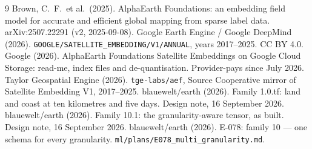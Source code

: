 \documentclass[10pt]{article}
\newcommand{\code}[1]{\texttt{#1}}
\begin{document}
\begin{thebibliography}{9}\small
{} Brown, C.\ F.\ et al.\ (2025). AlphaEarth Foundations: an embedding field model for accurate and efficient global mapping from sparse label data. arXiv:2507.22291 (v2, 2025-09-08).
 Google Earth Engine / Google DeepMind (2026). \code{GOOGLE/SATELLITE\_EMBEDDING/V1/ANNUAL}, years 2017--2025. CC BY 4.0.
 Google (2026). AlphaEarth Foundations Satellite Embeddings on Google Cloud Storage: read-me, index files and de-quantisation. Provider-pays since July 2026.
 Taylor Geospatial Engine (2026). \code{tge-labs/aef}, Source Cooperative mirror of Satellite Embedding V1, 2017--2025.
 blauewelt/earth (2026). Family 1.0.tf: land and coast at ten kilometres and five days. Design note, 16 September 2026.
 blauewelt/earth (2026). Family 10.1: the granularity-aware tensor, as built. Design note, 16 September 2026.
 blauewelt/earth (2026). E-078: family 10 --- one schema for every granularity. \code{ml/plans/E078\_multi\_granularity.md}.
\end{thebibliography}
\end{document}
